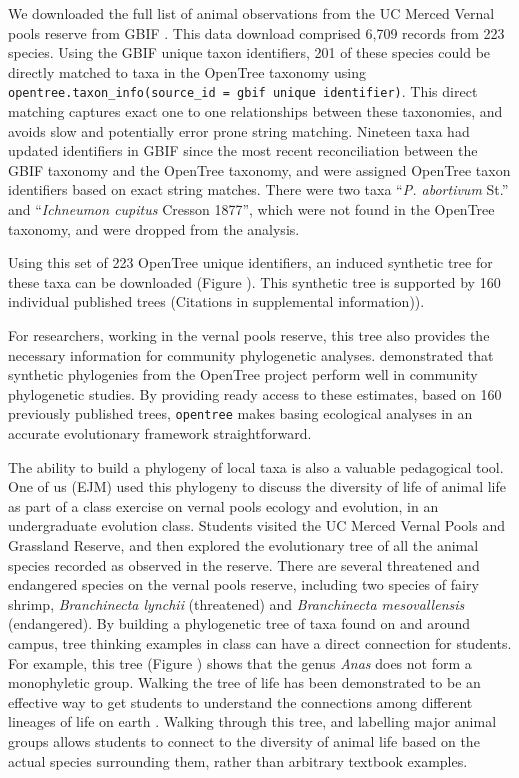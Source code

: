 \documentclass[oupdraft]{sysbio_sse}
\begin{document}
We downloaded the full list of animal observations from the UC Merced Vernal pools reserve from GBIF \citep{gbif_secretariat_gbif_2019}. This data download comprised 6,709 records from 223 species. Using the GBIF unique taxon identifiers, 201 of these species could be directly matched to taxa in the OpenTree taxonomy using \texttt{opentree.taxon\_info(source\_id = {gbif unique identifier})}. This direct matching captures exact one to one relationships between these taxonomies, and avoids slow and potentially error prone string matching. Nineteen taxa had updated identifiers in GBIF since the most recent reconciliation between the GBIF taxonomy and the OpenTree taxonomy, and were assigned OpenTree taxon identifiers based on exact string matches. There were two taxa ``\textit{P. abortivum} St.'' and ``\textit{Ichneumon cupitus} Cresson 1877'', which were not found in the OpenTree taxonomy, and were dropped from the analysis.


Using this set of 223 OpenTree unique identifiers, an induced synthetic tree for these taxa can be downloaded (Figure \vernalanimals). This synthetic tree is supported by 160 individual published trees (Citations in supplemental information)).


For researchers, working in the vernal pools reserve, this tree also provides the necessary information for community phylogenetic analyses. \citet{li_for_2019} demonstrated that synthetic phylogenies from the OpenTree project perform well in community phylogenetic studies. By providing ready access to these estimates, based on 160 previously published trees, \texttt{opentree} makes basing ecological analyses in an accurate evolutionary framework straightforward.


The ability to build a phylogeny of local taxa is also a valuable pedagogical tool. One of us (EJM) used this phylogeny to discuss the diversity of life of animal life as part of a class exercise on vernal pools ecology and evolution, in an undergraduate evolution class. 
Students visited the UC Merced Vernal Pools and Grassland Reserve, and then explored the evolutionary tree of all the animal species recorded as observed in the reserve. 
There are several threatened and endangered species on the vernal pools reserve, including two species of fairy shrimp, \textit{Branchinecta lynchii} (threatened) and \textit{Branchinecta mesovallensis} (endangered). 
By building a phylogenetic tree of taxa found on and around campus, tree thinking examples in class can have a direct connection for students. For example, this tree (Figure \vernalanimals) shows that the genus \textit{Anas} does not form a monophyletic group. Walking the tree of life has been demonstrated to be an effective way to get students to understand the connections among different lineages of life on earth \citep{ballen_walking_2017}. Walking through this tree, and labelling major animal groups allows students to connect to the diversity of animal life based on the actual species surrounding them, rather than arbitrary textbook examples.
\end{document}
